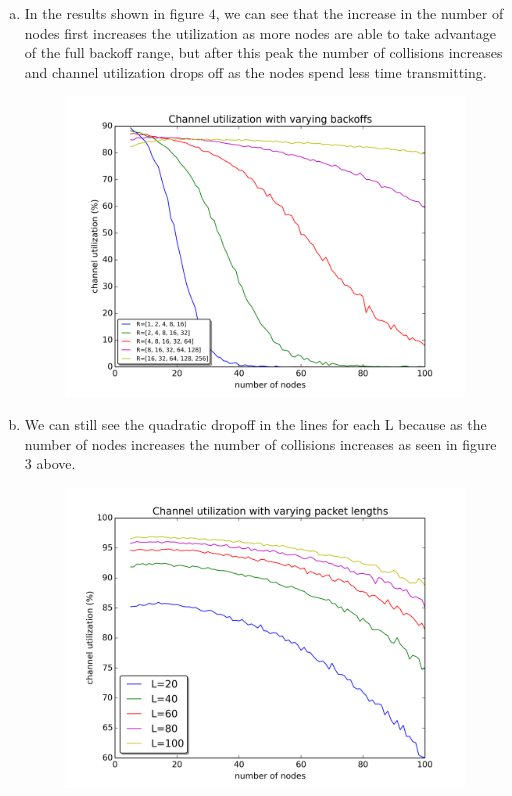 \documentclass[11pt]{article}
\begin{document}
\begin{enumerate}[a.]
\newpage

\vspace*{2mm}
\item In the results shown in figure $4$, we can see that the increase in the number of nodes first increases the utilization as more nodes are able to take advantage of the full backoff range, but after this peak the number of collisions increases and channel utilization drops off as the nodes spend less time transmitting.

\begin{figure}[H]
\centering
\includegraphics[width=.9\textwidth]{partD.png}
\caption{}
\end{figure}

\newpage

\vspace*{2mm}
\item We can still see the quadratic dropoff in the lines for each L because as the number of nodes increases the number of collisions increases as seen in figure 3 above. 

\begin{figure}[H]
\centering
\includegraphics[width=.9\textwidth]{partE.png}
\caption{}
\end{figure}


\end{enumerate}
\end{document}
